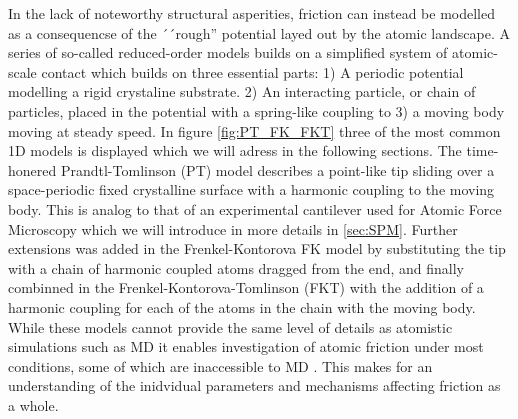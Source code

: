 




In the lack of noteworthy structural asperities, friction can instead be
modelled as a consequencse of the ´´rough'' potential layed out by the atomic landscape. A series of so-called reduced-order models builds on a simplified system of atomic-scale contact which builds on three essential parts: 1) A periodic potential modelling a rigid crystaline substrate. 2) An interacting particle, or chain of particles, placed in the potential with a spring-like coupling to 3) a moving body moving at steady speed. In figure
\cref{fig:PT_FK_FKT} three of the most common 1D models is displayed which we will adress in the following sections. The time-honered Prandtl-Tomlinson (PT) model describes a point-like tip sliding over a space-periodic fixed crystalline surface with a harmonic coupling to the
moving body. This is analog to that of an experimental cantilever used
for Atomic Force Microscopy which we will introduce in more details in \cref{sec:SPM}. Further extensions was added in the Frenkel-Kontorova \acrshort{FK} model by substituting the tip with a chain of harmonic coupled atoms dragged from the end, and finally combinned in the Frenkel-Kontorova-Tomlinson (\acrshort{FKT}) with the addition of a harmonic coupling for each of the atoms in the chain with the moving body. While these models cannot provide the same level of details as atomistic simulations such as \acrshort{MD} it enables investigation of atomic friction under most conditions, some of which are inaccessible to \acrshort{MD} \cite{Yalin_2011}. This makes for an understanding of the inidvidual parameters and mechanisms affecting friction as a whole. 





